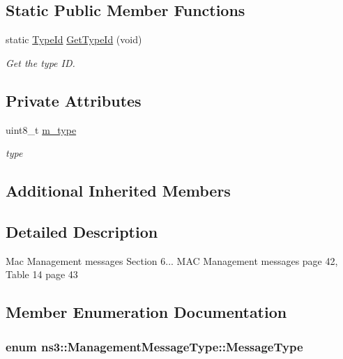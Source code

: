 \subsection*{Static Public Member Functions}
\begin{DoxyCompactItemize}
\item 
static \hyperlink{classns3_1_1TypeId}{Type\+Id} \hyperlink{classns3_1_1ManagementMessageType_acc8a8f8db45d28954b300a9fb5dddf03}{Get\+Type\+Id} (void)
\begin{DoxyCompactList}\small\item\em Get the type ID. \end{DoxyCompactList}\end{DoxyCompactItemize}
\subsection*{Private Attributes}
\begin{DoxyCompactItemize}
\item 
uint8\+\_\+t \hyperlink{classns3_1_1ManagementMessageType_a4a91e734653ae86b4a72a60b659d8940}{m\+\_\+type}
\begin{DoxyCompactList}\small\item\em type \end{DoxyCompactList}\end{DoxyCompactItemize}
\subsection*{Additional Inherited Members}


\subsection{Detailed Description}
Mac Management messages Section 6... M\+AC Management messages page 42, Table 14 page 43 

\subsection{Member Enumeration Documentation}
\subsubsection[{\texorpdfstring{Message\+Type}{MessageType}}]{\setlength{\rightskip}{0pt plus 5cm}enum {\bf ns3\+::\+Management\+Message\+Type\+::\+Message\+Type}}\hypertarget{classns3_1_1ManagementMessageType_a0e0c7a1e263538f0379d1bdb015abe3d}{}\label{classns3_1_1ManagementMessageType_a0e0c7a1e263538f0379d1bdb015abe3d}


